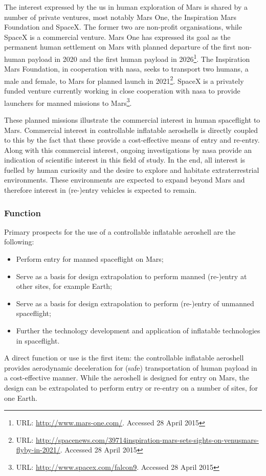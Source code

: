 The interest expressed by the \gls{us} in human exploration of Mars is shared by a number of private ventures, most notably Mars One, the Inspiration Mars Foundation and SpaceX. The former two are non-profit organisations, while SpaceX is a commercial venture. Mars One has expressed its goal as the permanent human settlement on Mars with planned departure of the first non-human payload in 2020 and the first human payload in 2026\footnote{URL: \url{http://www.mars-one.com/}. Accessed 28 April 2015}. The Inspiration Mars Foundation, in cooperation with \gls{nasa}, seeks to transport two humans, a male and female, to Mars for planned launch in 2021\footnote{URL: \url{http://spacenews.com/39714inspiration-mars-sets-sights-on-venusmars-flyby-in-2021/}. Accessed 28 April 2015}. SpaceX is a privately funded venture currently working in close cooperation with \gls{nasa} to provide launchers for manned missions to Mars\footnote{URL: \url{http://www.spacex.com/falcon9}. Accessed 28 April 2015}.

These planned missions illustrate the commercial interest in human spaceflight to Mars. Commercial interest in controllable inflatable aeroshells is directly coupled to this by the fact that these provide a cost-effective means of entry and re-entry. Along with this commercial interest, ongoing investigations by \gls{nasa} provide an indication of scientific interest in this field of study. In the end, all interest is fuelled by human curiosity and the desire to explore and habitate extraterrestrial environments. These environments are expected to expand beyond Mars and therefore interest in (re-)entry vehicles is expected to remain.


\subsubsection{Function}
Primary prospects for the use of a controllable inflatable aeroshell are the following:
\begin{itemize}
\item Perform entry for manned spaceflight on Mars;
\item Serve as a basis for design extrapolation to perform manned (re-)entry at other sites, for example Earth;
\item Serve as a basis for design extrapolation to perform (re-)entry of unmanned spaceflight;
\item Further the technology development and application of inflatable technologies in spaceflight.
\end{itemize}
A direct function or use is the first item: the controllable inflatable aeroshell provides aerodynamic deceleration for (safe) transportation of human payload in a cost-effective manner. While the aeroshell is designed for entry on Mars, the design can be extrapolated to perform entry or re-entry on a number of sites, for one Earth.

